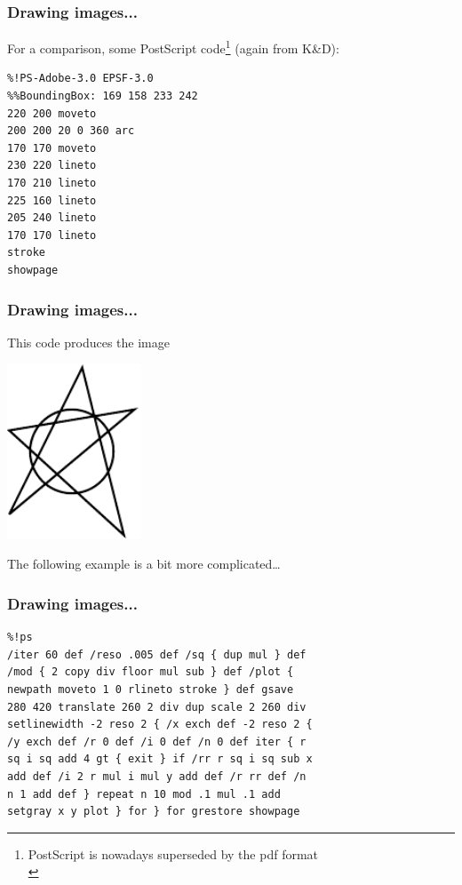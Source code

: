 \documentclass[13pt]{beamer}
\begin{document}
\begin{frame}[fragile]\frametitle{Drawing images...}
For a comparison, some PostScript code\footnote{PostScript is nowadays
superseded by the pdf format\\ \strut} (again from K\&D):
\begin{verbatim}
%!PS-Adobe-3.0 EPSF-3.0
%%BoundingBox: 169 158 233 242
220 200 moveto
200 200 20 0 360 arc
170 170 moveto
230 220 lineto
170 210 lineto
225 160 lineto
205 240 lineto
170 170 lineto
stroke
showpage
\end{verbatim}
\end{frame}


\begin{frame}[fragile]\frametitle{Drawing images...}
This code produces the image
\begin{center}
\includegraphics[width=0.3\textwidth]{img/hassakka}
\end{center}
The following example is a bit more complicated\dots
\end{frame}


\begin{frame}[fragile]\frametitle{Drawing images...}
\small
\begin{verbatim}
%!ps
/iter 60 def /reso .005 def /sq { dup mul } def
/mod { 2 copy div floor mul sub } def /plot {
newpath moveto 1 0 rlineto stroke } def gsave
280 420 translate 260 2 div dup scale 2 260 div
setlinewidth -2 reso 2 { /x exch def -2 reso 2 {
/y exch def /r 0 def /i 0 def /n 0 def iter { r
sq i sq add 4 gt { exit } if /rr r sq i sq sub x
add def /i 2 r mul i mul y add def /r rr def /n
n 1 add def } repeat n 10 mod .1 mul .1 add
setgray x y plot } for } for grestore showpage
\end{verbatim}
\end{frame}
\end{document}
